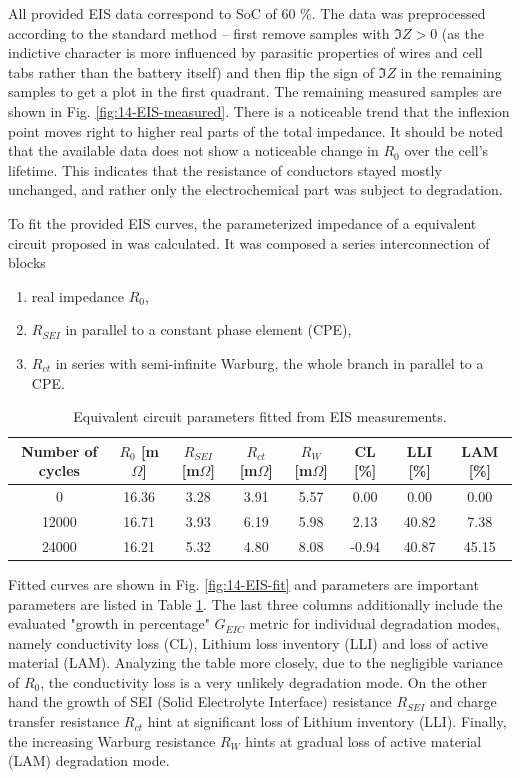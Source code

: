 All provided EIS data correspond to SoC of 60 \%. The data was preprocessed according to the standard method -- first remove samples with $\Im Z > 0$ (as the indictive character is more influenced by parasitic properties of wires and cell tabs rather than the battery itself) and then flip the sign of $\Im Z$ in the remaining samples to get a plot in the first quadrant. The remaining measured samples are shown in Fig. \ref{fig:14-EIS-measured}. There is a noticeable trend that the inflexion point moves right to higher real parts of the total impedance. It should be noted that the available data does not show a noticeable change in $R_0$ over the cell's lifetime. This indicates that the resistance of conductors stayed mostly unchanged, and rather only the electrochemical part was subject to degradation.

To fit the provided EIS curves, the parameterized impedance of a equivalent circuit proposed in \cite{fernandez} was calculated. It was composed a series interconnection of blocks
\begin{enumerate}
    \item real impedance $R_0$,
    \item $R_{SEI}$ in parallel to a constant phase element (CPE),
    \item $R_{ct}$ in series with semi-infinite Warburg, the whole branch in parallel to a CPE.
\end{enumerate}

\begin{table}[]
    \centering
    \begin{tabular}{c||c|c|c|c||c|c|c}
        Number of cycles & $R_0$ [m$\Omega$] & $R_{SEI}$ [m$\Omega$] & $R_{ct}$ [m$\Omega$] & $R_{W}$ [m$\Omega$] & CL [\%] & LLI [\%] & LAM [\%] \\ \hline \hline
        0 & 16.36 & 3.28 & 3.91 & 5.57 & 0.00 & 0.00 & 0.00 \\
        12000 & 16.71 & 3.93 & 6.19 & 5.98 & 2.13 & 40.82 & 7.38 \\
        24000 & 16.21 & 5.32 & 4.80 & 8.08 & -0.94 & 40.87 & 45.15 \\

    \end{tabular}
    \caption{Equivalent circuit parameters fitted from EIS measurements.}
    \label{tab:14-eis}
\end{table}

Fitted curves are shown in Fig. \ref{fig:14-EIS-fit} and parameters are important parameters are listed in Table \ref{tab:14-eis}. The last three columns additionally include the evaluated "growth in percentage" $G_{EIC}$ metric for individual degradation modes, namely conductivity loss (CL), Lithium loss inventory (LLI) and loss of active material (LAM). Analyzing the table more closely, due to the negligible variance of $R_0$, the conductivity loss is a very unlikely degradation mode. On the other hand the growth of SEI (Solid Electrolyte Interface) resistance $R_{SEI}$ and charge transfer resistance $R_{ct}$ hint at significant loss of Lithium inventory (LLI). Finally, the increasing Warburg resistance $R_W$ hints at gradual loss of active material (LAM) degradation mode.




